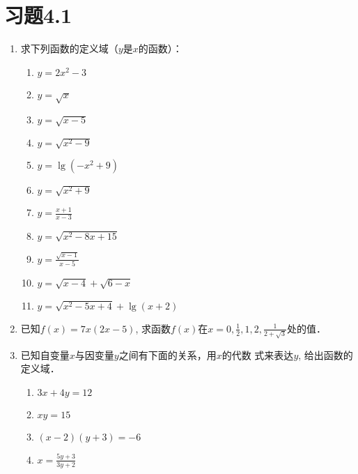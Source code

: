 \section*{习题4.1}
\begin{enumerate}
    \item     求下列函数的定义域（$y$是$x$的函数）：
    \begin{multicols}{2}
\begin{enumerate}
    \item $y=2x^2-3$
    \item $y=\sqrt{x}$
    \item $y=\sqrt{x-5}$
    \item $y=\sqrt{x^2-9}$
    \item $y=\lg(-x^2+9)$
    \item $y=\sqrt{x^2+9}$
    \item $y=\frac{x+1}{x-3}$
    \item $y=\sqrt{x^2-8x+15}$
    \item $y=\frac{\sqrt{x-1}}{x-5}$
    \item $y=\sqrt{x-4}+\sqrt{6-x}$
    \item $y=\sqrt{x^2-5x+4}+\lg(x+2)$

\end{enumerate}        
    \end{multicols}

\item 已知$f(x)=7x(2x-5)$, 求函数$f(x)$在$x=0,\frac{1}{2},1,2,
    \frac{1}{2+\sqrt{3}}$处的值．
    
\item 已知自变量$x$与因变量$y$之间有下面的关系，用$x$的代数
    式来表达$y$, 给出函数的定义域．
\begin{multicols}{2}
\begin{enumerate}
    \item $3x+4y=12$
    \item $xy=15$
    \item $(x-2)(y+3)=-6$
    \item $x=\frac{5y+3}{3y+2}$
\end{enumerate}
\end{multicols}


\end{enumerate}
